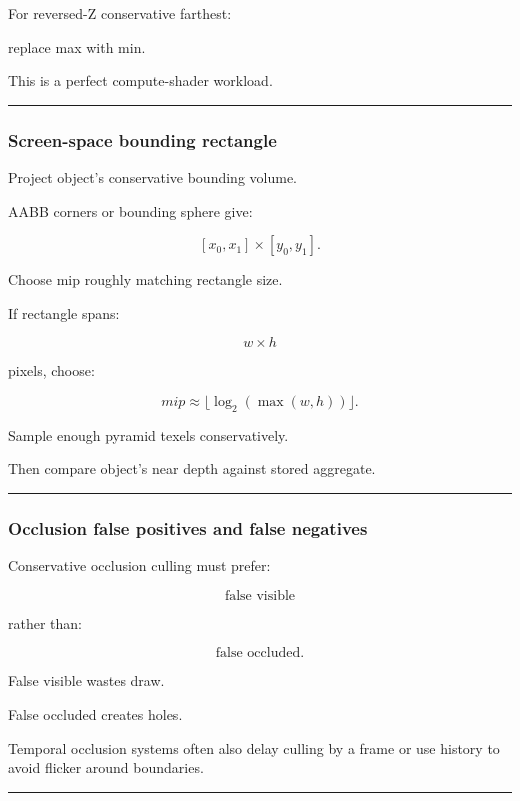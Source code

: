 For reversed-Z conservative farthest:

replace max with min.

This is a perfect compute-shader workload.

\begin{center}\rule{0.5\linewidth}{0.5pt}\end{center}

\subsubsection{Screen-space bounding rectangle}\label{screen-space-bounding-rectangle}

Project object's conservative bounding volume.

AABB corners or bounding sphere give:

\[
[x_0,x_1]
\times
[y_0,y_1].
\]

Choose mip roughly matching rectangle size.

If rectangle spans:

\[
w\times h
\]

pixels, choose:

\[
mip\approx
\lfloor\log_2(\max(w,h))\rfloor.
\]

Sample enough pyramid texels conservatively.

Then compare object's near depth against stored aggregate.

\begin{center}\rule{0.5\linewidth}{0.5pt}\end{center}

\subsubsection{Occlusion false positives and false negatives}\label{occlusion-false-positives-and-false-negatives}

Conservative occlusion culling must prefer:

\[
\boxed{
\text{false visible}
}
\]

rather than:

\[
\boxed{
\text{false occluded}.
}
\]

False visible wastes draw.

False occluded creates holes.

Temporal occlusion systems often also delay culling by a frame or use history to avoid flicker around boundaries.

\begin{center}\rule{0.5\linewidth}{0.5pt}\end{center}

